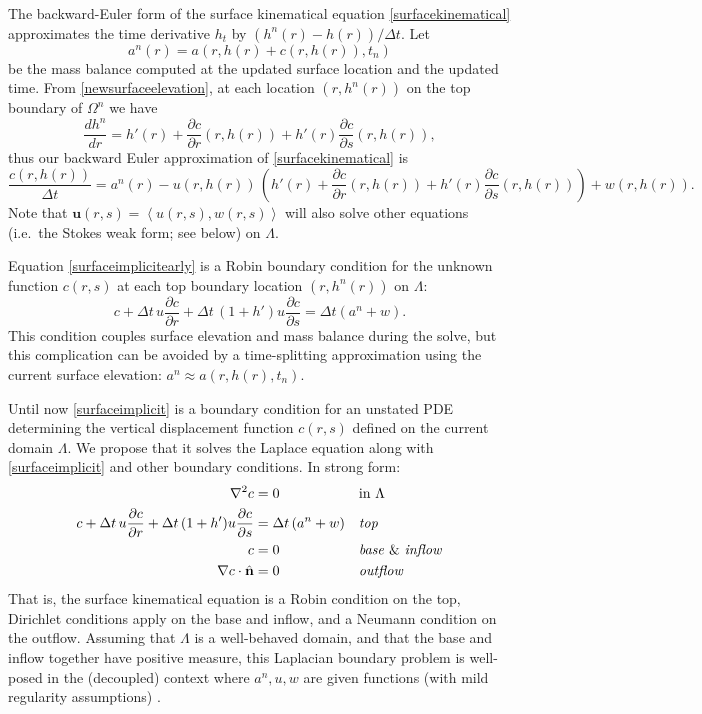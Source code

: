 \documentclass[letterpaper,final,12pt,reqno]{amsart}
\newcommand{\grad}{\nabla}
\newcommand{\hbn}{\hat{\mathbf{n}}}
\newcommand{\bu}{\mathbf{u}}
\begin{document}
The backward-Euler form of the surface kinematical equation \eqref{surfacekinematical} approximates the time derivative $h_t$ by $(h^n(r) - h(r))/\Delta t$.  Let
    $$a^n(r) = a\left(r,h(r) + c(r,h(r)),t_n\right)$$
be the mass balance computed at the updated surface location and the updated time.  From \eqref{newsurfaceelevation}, at each location $(r,h^n(r))$ on the top boundary of $\Omega^n$ we have
    $$\frac{dh^n}{d r} = h'(r) + \frac{\partial c}{\partial r}(r,h(r)) + h'(r) \frac{\partial c}{\partial s}(r,h(r)),$$
thus our backward Euler approximation of \eqref{surfacekinematical} is
\begin{equation}
\frac{c(r,h(r))}{\Delta t} = a^n(r) - u(r,h(r))\,\left(h'(r) + \frac{\partial c}{\partial r}(r,h(r)) + h'(r) \frac{\partial c}{\partial s}(r,h(r))\right) + w(r,h(r)). \label{surfaceimplicitearly}
\end{equation}
Note that $\bu(r,s)=\left<u(r,s),w(r,s)\right>$ will also solve other equations (i.e.~the Stokes weak form; see below) on $\Lambda$.

Equation \eqref{surfaceimplicitearly} is a Robin boundary condition for the unknown function $c(r,s)$ at each top boundary location $(r,h^n(r))$ on $\Lambda$:
\begin{equation}
c + \Delta t\,u \frac{\partial c}{\partial r} + \Delta t\,(1+h') u \frac{\partial c}{\partial s} = \Delta t \left(a^n + w\right). \label{surfaceimplicit}
\end{equation}
This condition couples surface elevation and mass balance during the solve, but this complication can be avoided by a time-splitting approximation using the current surface elevation: $a^n \approx a(r,h(r),t_n)$.

Until now \eqref{surfaceimplicit} is a boundary condition for an unstated PDE determining the vertical displacement function $c(r,s)$ defined on the current domain $\Lambda$.  We propose that it solves the Laplace equation along with \eqref{surfaceimplicit} and other boundary conditions.  In strong form:
\begin{align}
\grad^2 c &= 0 &&\text{in } \Lambda \label{claplace} \\
c + \Delta t\,u \frac{\partial c}{\partial r} + \Delta t\,(1+h') u \frac{\partial c}{\partial s} &= \Delta t \left(a^n + w\right) &&\emph{top} \notag \\
c &= 0 &&\text{\emph{base} \& \emph{inflow}} \notag \\
\grad c\cdot \hbn &= 0 &&\emph{outflow} \notag
\end{align}
That is, the surface kinematical equation is a Robin condition on the top, Dirichlet conditions apply on the base and inflow, and a Neumann condition on the outflow.  Assuming that $\Lambda$ is a well-behaved domain, and that the base and inflow together have positive measure, this Laplacian boundary problem is well-posed in the (decoupled) context where $a^n,u,w$ are given functions (with mild regularity assumptions) \cite{Evans2010}.
\end{document}

